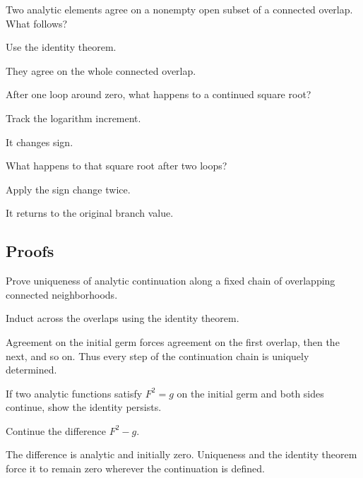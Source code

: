 \begin{exercise}\label{exr:iv15-expand-03}
Two analytic elements agree on a nonempty open subset of a connected overlap. What follows?
\end{exercise}
\begin{hint}
Use the identity theorem.
\end{hint}
\begin{solution}
They agree on the whole connected overlap.
\end{solution}

\begin{exercise}\label{exr:iv15-expand-04}
After one loop around zero, what happens to a continued square root?
\end{exercise}
\begin{hint}
Track the logarithm increment.
\end{hint}
\begin{solution}
It changes sign.
\end{solution}

\begin{exercise}\label{exr:iv15-expand-05}
What happens to that square root after two loops?
\end{exercise}
\begin{hint}
Apply the sign change twice.
\end{hint}
\begin{solution}
It returns to the original branch value.
\end{solution}

\subsection*{Proofs}

\begin{exercise}\label{exr:iv15-expand-06}
Prove uniqueness of analytic continuation along a fixed chain of overlapping connected neighborhoods.
\end{exercise}
\begin{hint}
Induct across the overlaps using the identity theorem.
\end{hint}
\begin{solution}
Agreement on the initial germ forces agreement on the first overlap, then the next, and so on. Thus every step of the continuation chain is uniquely determined.
\end{solution}

\begin{exercise}\label{exr:iv15-expand-07}
If two analytic functions satisfy \(F^2=g\) on the initial germ and both sides continue, show the identity persists.
\end{exercise}
\begin{hint}
Continue the difference \(F^2-g\).
\end{hint}
\begin{solution}
The difference is analytic and initially zero. Uniqueness and the identity theorem force it to remain zero wherever the continuation is defined.
\end{solution}

